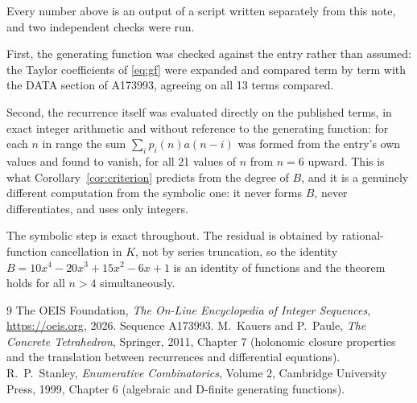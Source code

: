 \documentclass[11pt,a4paper]{article}
\theoremstyle{plain}
\theoremstyle{definition}
\begin{document}
Every number above is an output of a script written separately from this note, and two
independent checks were run.

First, the generating function was checked against the entry rather than assumed: the
Taylor coefficients of \eqref{eq:gf} were expanded and compared term by term with the DATA
section of A173993, agreeing on all 13 terms compared.

Second, the recurrence itself was evaluated directly on the published terms, in exact
integer arithmetic and without reference to the generating function: for each $n$ in range
the sum $\sum_{i}p_{i}(n)a(n-i)$ was formed from the entry's own values and found to
vanish, for all 21 values of $n$ from $n=6$ upward. This is what
Corollary~\ref{cor:criterion} predicts from the degree of $B$, and it is a genuinely
different computation from the symbolic one: it never forms $B$, never differentiates, and
uses only integers.

The symbolic step is exact throughout. The residual is obtained by rational-function
cancellation in $K$, not by series truncation, so the identity $B=10 x^{4} - 20 x^{3} + 15 x^{2} - 6 x + 1$ is an
identity of functions and the theorem holds for all $n>4$ simultaneously.

\begin{thebibliography}{9}
 The OEIS Foundation, \emph{The On-Line Encyclopedia of Integer Sequences},
\url{https://oeis.org}, 2026. Sequence A173993.
 M.~Kauers and P.~Paule, \emph{The Concrete Tetrahedron}, Springer, 2011,
Chapter 7 (holonomic closure properties and the translation between recurrences and
differential equations).
 R.~P.~Stanley, \emph{Enumerative Combinatorics}, Volume 2, Cambridge
University Press, 1999, Chapter 6 (algebraic and D-finite generating functions).
\end{thebibliography}
\end{document}
